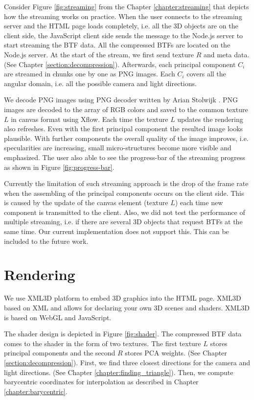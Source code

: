 Consider Figure \ref{fig:streaming} from the Chapter \ref{chapter:streaming} that depicts how the streaming works on practice.
When the user connects to the streaming server and the HTML page loads completely, i.e. all the 3D objects are on the client side, the JavaScript client side sends the message to the Node.js server to start streaming the BTF data.
All the compressed BTFs are located on the Node.js server.
At the start of the stream, we first send texture $R$ and meta data. (See Chapter  \ref{section:decompression}).
Afterwards, each principal component $C_{i}$ are streamed in chunks one by one as PNG images.
Each $C_{i}$ covers all the angular domain, i.e. all the possible camera and light directions.

We decode PNG images using PNG decoder written by Arian Stolwijk \cite{pngreader}. PNG images are decoded to the array of RGB colors and saved to the common texture $L$ in canvas format using Xflow.
Each time the texture $L$ updates the rendering also refreshes.
Even with the first principal component the resulted image looks plausible.
With further components the overall quality of the image improves, i.e. specularities are increasing, small micro-structures become more visible and emphasized.
The user also  able to see the progress-bar of the streaming progress as shown in  Figure \ref{fig:progress-bar}.



Currently the limitation of such streaming approach is the drop of the frame rate when the assembling of the principal components occurs on the client side.
This is caused by the update of the canvas element (texture $L$) each time new component is transmitted to the client.
Also, we did not test the performance of multiple streaming, i.e. if there are several 3D objects that request BTFs at the same time.
 Our current implementation does not support this.
This can be included to the future work. 

\section{Rendering}
\label{section:impl_rendering}


We use XML3D \cite{xml3d} platform to embed 3D graphics into the HTML page. XML3D based on XML and allows for declaring your own 3D scenes and shaders.
XML3D is based on WebGL and JavaScript.

The shader design is depicted in Figure \ref{fig:shader}.
The compressed BTF data comes to the shader in the form of two textures. 
The first texture $L$ stores principal components and the second $R$ stores PCA weights. (See Chapter \ref{section:decompression}).
First, we find three closest directions for the camera and light directions. (See Chapter \ref{chapter:finding_triangle}).
Then, we compute barycentric coordinates for interpolation as described in Chapter \ref{chapter:barycentric}.

